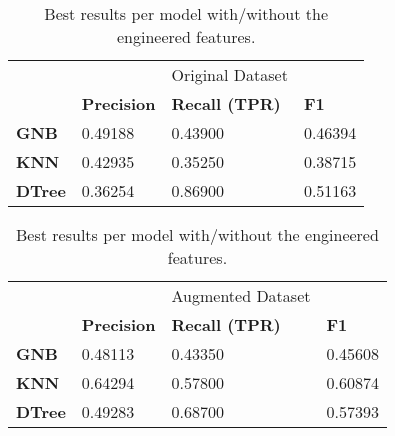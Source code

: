 \documentclass{article}
\begin{document}
\begin{table}[H]
\begin{center}
\begin{tabular}{llll}
                                     &                                         & Original Dataset                           &                                  \\ \cline{2-4} 
\multicolumn{1}{l|}{}                & \multicolumn{1}{l|}{\textbf{Precision}} & \multicolumn{1}{l|}{\textbf{Recall (TPR)}} & \multicolumn{1}{l|}{\textbf{F1}} \\ \hline
\multicolumn{1}{|l|}{\textbf{GNB}}   & \multicolumn{1}{l|}{0.49188}            & \multicolumn{1}{l|}{0.43900}               & \multicolumn{1}{l|}{0.46394}     \\ \hline
\multicolumn{1}{|l|}{\textbf{KNN}}   & \multicolumn{1}{l|}{0.42935}            & \multicolumn{1}{l|}{0.35250}               & \multicolumn{1}{l|}{0.38715}     \\ \hline
\multicolumn{1}{|l|}{\textbf{DTree}} & \multicolumn{1}{l|}{0.36254}            & \multicolumn{1}{l|}{0.86900}               & \multicolumn{1}{l|}{0.51163}     \\ \hline
\end{tabular}
\begin{tabular}{llll}
                                     &                                         & Augmented Dataset                           &                                  \\ \cline{2-4} 
\multicolumn{1}{l|}{}                & \multicolumn{1}{l|}{\textbf{Precision}} & \multicolumn{1}{l|}{\textbf{Recall (TPR)}} & \multicolumn{1}{l|}{\textbf{F1}} \\ \hline
\multicolumn{1}{|l|}{\textbf{GNB}}   & \multicolumn{1}{l|}{0.48113}            & \multicolumn{1}{l|}{0.43350}               & \multicolumn{1}{l|}{0.45608}     \\ \hline
\multicolumn{1}{|l|}{\textbf{KNN}}   & \multicolumn{1}{l|}{0.64294}            & \multicolumn{1}{l|}{0.57800}               & \multicolumn{1}{l|}{0.60874}     \\ \hline
\multicolumn{1}{|l|}{\textbf{DTree}} & \multicolumn{1}{l|}{0.49283}            & \multicolumn{1}{l|}{0.68700}               & \multicolumn{1}{l|}{0.57393}     \\ \hline
\end{tabular}
\end{center}
\caption{Best results per model with/without the engineered features.}
\label{tab:with_without_eng}
\end{table} 
\end{document}
